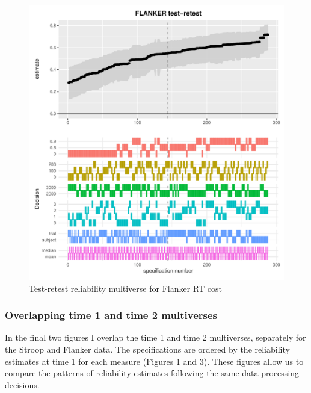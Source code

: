 \documentclass[
  english,
  man,floatsintext]{apa6}
\begin{document}
\begin{figure}
\centering
\includegraphics{Reliability_Multiverse_files/figure-latex/unnamed-chunk-10-1.pdf}
\caption{\label{fig:unnamed-chunk-10}Test-retest reliability multiverse for Flanker RT cost}
\end{figure}

\newpage

\hypertarget{overlapping-time-1-and-time-2-multiverses}{%
\subsubsection{Overlapping time 1 and time 2 multiverses}\label{overlapping-time-1-and-time-2-multiverses}}

In the final two figures I overlap the time 1 and time 2 multiverses, separately for the Stroop and Flanker data. The specifications are ordered by the reliability estimates at time 1 for each measure (Figures 1 and 3). These figures allow us to compare the patterns of reliability estimates following the same data processing decisions.
\end{document}
